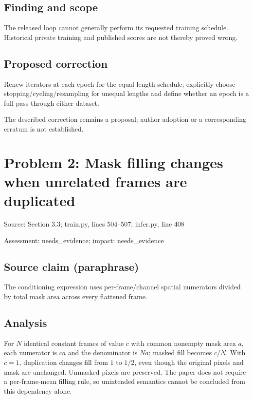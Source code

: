 \documentclass[11pt]{article}
\begin{document}
\subsection*{Finding and scope}

The released loop cannot generally perform its requested training schedule. Historical private training and published scores are not thereby proved wrong.

\subsection*{Proposed correction}

Renew iterators at each epoch for the equal-length schedule; explicitly choose stopping/cycling/resampling for unequal lengths and define whether an epoch is a full pass through either dataset.

The described correction remains a proposal; author adoption or a corresponding erratum is not established.

\section*{Problem 2: Mask filling changes when unrelated frames are duplicated}

Source: Section 3.3; train.py, lines 504–507; infer.py, line 408

Assessment: needs\_evidence; impact: needs\_evidence

\subsection*{Source claim (paraphrase)}

The conditioning expression uses per-frame/channel spatial numerators divided by total mask area across every flattened frame.

\subsection*{Analysis}

For \(N\) identical constant frames of value \(c\) with common nonempty mask area \(a\), each numerator is \(ca\) and the denominator is \(Na\); masked fill becomes \(c/N\). With \(c=1\), duplication changes fill from \(1\) to \(1/2\), even though the original pixels and mask are unchanged. Unmasked pixels are preserved. The paper does not require a per-frame-mean filling rule, so unintended semantics cannot be concluded from this dependency alone.
\end{document}

